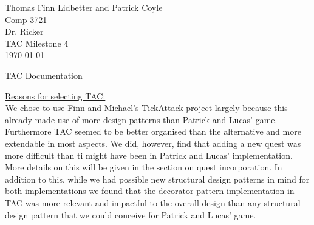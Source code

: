 \documentclass[letter paper, 12pt]{article}
\newcommand{\tab}{${}_{}$\hspace{0.2in}}
\newcommand{\noin}{\noindent}
\begin{document}
\noindent Thomas Finn Lidbetter and Patrick Coyle\\
Comp 3721\\
Dr. Ricker\\
TAC Milestone 4\\
\today \bigskip
\begin{center}
	TAC Documentation
\end{center}
\noin \underline{Reasons for selecting TAC:}\\
\tab We chose to use Finn and Michael's TickAttack project largely because this already made use of more design patterns than Patrick and Lucas' game. Furthermore TAC seemed to be better organised than the alternative and more extendable in most aspects. We did, however, find that adding a new quest was more difficult than ti might have been in Patrick and Lucas' implementation. More details on this will be given in the section on quest incorporation. In addition to this, while we had possible new structural design patterns in mind for both implementations we found that the decorator pattern implementation in TAC was more relevant and impactful to the overall design than any structural design pattern that we could conceive for Patrick and Lucas' game.\bigskip
\end{document}
